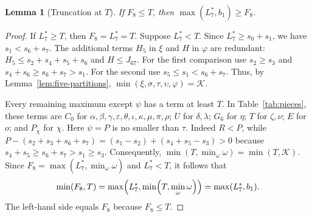\documentclass[12pt]{amsart}
\newtheorem{lemma}[theorem]{Lemma}
\theoremstyle{definition}
\theoremstyle{remark}
\numberwithin{equation}{section}
\numberwithin{figure}{section}
\numberwithin{table}{section}
\newcommand{\F}{F_8}
\newcommand{\KK}{\mathcal K}
\newcommand{\omicron}{o}
\newcommand{\Pchi}{P_\chi}
\begin{document}
\begin{lemma}[Truncation at $T$]\label{lem:threshold}
If $\F\le T$, then $\max(L_7^*,b_1)\ge\F$.
\end{lemma}
\begin{proof}
If $L_7^*\ge T$, then $\F=L_7^*=T$. Suppose $L_7^*<T$.
Since $L_7^*\ge s_0+s_1$, we have $s_1<s_6+s_7$. The additional terms $H_5$
in $\xi$ and $H$ in $\varphi$ are redundant:
$H_5\le s_2+s_4+s_5+s_6$ and $H\le J_{67}$.
For the first comparison use $s_2\ge s_3$ and
$s_4+s_6\ge s_6+s_7>s_1$. For the second use
$s_5\le s_1<s_6+s_7$. Thus, by Lemma~\ref{lem:five-partitions},
$\min(\xi,\sigma,\tau,\upsilon,\varphi)=\KK$.

Every remaining maximum except $\psi$ has a term at
least $T$. In Table~\ref{tab:pieces}, these terms are $C_0$ for
$\alpha,\beta,\gamma,\varepsilon,\theta,\iota,\kappa,\mu,\pi,\rho$;
$U$ for $\delta,\lambda$; $G_6$ for $\eta$; $T$ for $\zeta,\nu$;
$E$ for $\omicron$; and $\Pchi$ for $\chi$.
Here $\psi=P$ is no smaller than $\tau$.
Indeed $R<P$, while
$P-(s_2+s_3+s_6+s_7)=(s_1-s_2)+(s_4+s_5-s_3)>0$ because $s_4+s_5\ge s_6+s_7>s_1\ge s_3$.
Consequently, $\min(T,\min_\omega\omega)=\min(T,\KK)$.
Since $\F=\max(L_7^*,\min_\omega\omega)$ and $L_7^*<T$, it follows that
\begin{equation}\label{eq:truncation-arithmetic}
\min(\F,T)=\max\Bigl(L_7^*,\min\Bigl(T,\min_\omega\omega\Bigr)\Bigr)=\max(L_7^*,b_1).
\end{equation}
The left-hand side equals $\F$ because $\F\le T$.
\end{proof}
\end{document}
